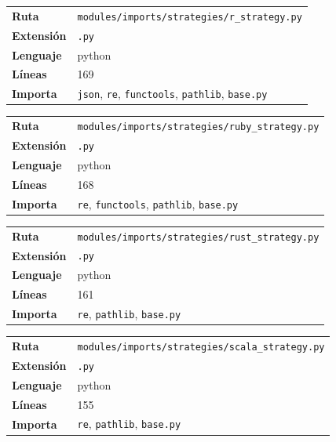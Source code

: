 \documentclass[12pt, a4paper]{report}
\begin{document}
\medskip

\begin{fichabox}
\small
\begin{tabular}{@{}ll@{}}
  \textbf{Ruta} & \texttt{modules/imports/strategies/r\_strategy.py} \\
  \textbf{Extensión} & \texttt{.py} \\
  \textbf{Lenguaje} & python \\
  \textbf{Líneas} & 169 \\
  \textbf{Importa} & \parbox[t]{10cm}{\texttt{json}, \texttt{re}, \texttt{functools}, \texttt{pathlib}, \texttt{base.py}} \\
\end{tabular}
\end{fichabox}

\medskip

\begin{fichabox}
\small
\begin{tabular}{@{}ll@{}}
  \textbf{Ruta} & \texttt{modules/imports/strategies/ruby\_strategy.py} \\
  \textbf{Extensión} & \texttt{.py} \\
  \textbf{Lenguaje} & python \\
  \textbf{Líneas} & 168 \\
  \textbf{Importa} & \parbox[t]{10cm}{\texttt{re}, \texttt{functools}, \texttt{pathlib}, \texttt{base.py}} \\
\end{tabular}
\end{fichabox}

\medskip

\begin{fichabox}
\small
\begin{tabular}{@{}ll@{}}
  \textbf{Ruta} & \texttt{modules/imports/strategies/rust\_strategy.py} \\
  \textbf{Extensión} & \texttt{.py} \\
  \textbf{Lenguaje} & python \\
  \textbf{Líneas} & 161 \\
  \textbf{Importa} & \parbox[t]{10cm}{\texttt{re}, \texttt{pathlib}, \texttt{base.py}} \\
\end{tabular}
\end{fichabox}

\medskip

\begin{fichabox}
\small
\begin{tabular}{@{}ll@{}}
  \textbf{Ruta} & \texttt{modules/imports/strategies/scala\_strategy.py} \\
  \textbf{Extensión} & \texttt{.py} \\
  \textbf{Lenguaje} & python \\
  \textbf{Líneas} & 155 \\
  \textbf{Importa} & \parbox[t]{10cm}{\texttt{re}, \texttt{pathlib}, \texttt{base.py}} \\
\end{tabular}
\end{fichabox}
\end{document}
